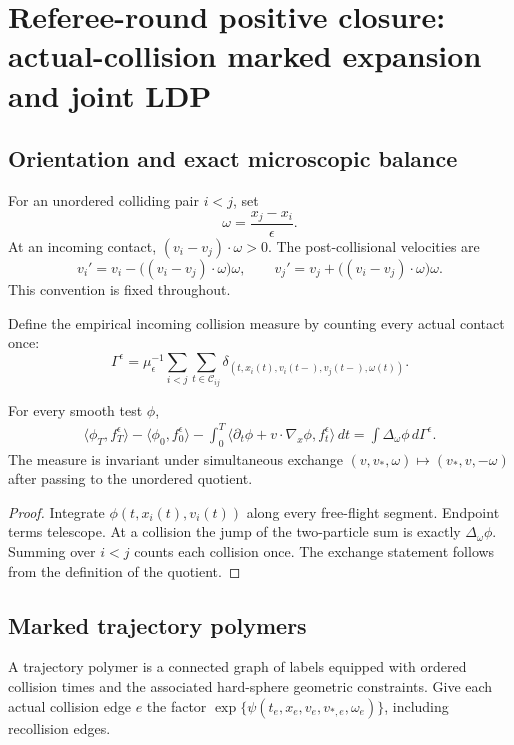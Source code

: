 \section{Referee-round positive closure: actual-collision marked expansion and joint LDP}
\label{sec:rr2-b2}

\subsection{Orientation and exact microscopic balance}

For an unordered colliding pair \(i<j\), set
\[
 \omega=\frac{x_j-x_i}{\epsilon}.
\]
At an incoming contact,
\((v_i-v_j)\cdot\omega>0\).  The post-collisional velocities are
\[
 v_i'=v_i-\big((v_i-v_j)\cdot\omega\big)\omega,\qquad
 v_j'=v_j+\big((v_i-v_j)\cdot\omega\big)\omega.
\]
This convention is fixed throughout.

Define the empirical incoming collision measure by counting every actual
contact once:
\[
 \Gamma^\epsilon
 =
 \mu_\epsilon^{-1}
 \sum_{i<j}\sum_{t\in\mathcal C_{ij}}
 \delta_{(t,x_i(t),v_i(t-),v_j(t-),\omega(t))}.
\]

\begin{proposition}
\label{prop:rr2-b2-balance}
For every smooth test \(\phi\),
\[
 \begin{aligned}
 \langle\phi_T,f_T^\epsilon\rangle-\langle\phi_0,f_0^\epsilon\rangle
 -\int_0^T\langle\partial_t\phi+v\cdot\nabla_x\phi,
 f_t^\epsilon\rangle\,dt
 =
 \int\Delta_\omega\phi\,d\Gamma^\epsilon .
 \end{aligned}
\]
The measure is invariant under simultaneous exchange
\((v,v_*,\omega)\mapsto(v_*,v,-\omega)\) after passing to the unordered
quotient.
\end{proposition}

\begin{proof}
Integrate \(\phi(t,x_i(t),v_i(t))\) along every free-flight segment.  Endpoint
terms telescope.  At a collision the jump of the two-particle sum is exactly
\(\Delta_\omega\phi\).  Summing over \(i<j\) counts each collision once.
The exchange statement follows from the definition of the quotient.
\end{proof}

\subsection{Marked trajectory polymers}

A trajectory polymer is a connected graph of labels equipped with ordered
collision times and the associated hard-sphere geometric constraints.  Give
each actual collision edge \(e\) the factor
\(\exp\{\psi(t_e,x_e,v_e,v_{*,e},\omega_e)\}\), including recollision edges.

